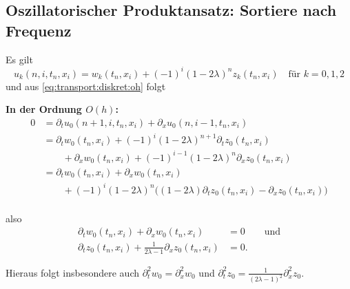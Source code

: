 \subsection{Oszillatorischer Produktansatz: Sortiere nach Frequenz}
\label{appendix:osz:sortiere_nach_frequenz}

Es gilt
\[ u_k(n, i, t_n, x_i) = w_k(t_n, x_i) + (-1)^i (1 - 2\lambda)^n z_k(t_n, x_i) \quad \text{für $k = 0,1,2$} \]
und aus \eqref{eq:transport:diskret:oh} folgt 

\vspace{0.4cm}
\noindent \textbf{In der Ordnung $O(h)$:}
\begin{align*}
0 &= \partial_t u_0(n+1, i, t_n, x_i) + \partial_x u_0(n, i-1, t_n, x_i)\\
&= \partial_t w_0(t_n, x_i) + (-1)^i (1 - 2\lambda)^{n+1} \partial_t z_0(t_n, x_i)\\
&\qquad + \partial_x w_0(t_n, x_i) + (-1)^{i-1} (1 - 2\lambda)^n \partial_x z_0(t_n, x_i)\\
&= \partial_t w_0(t_n, x_i) + \partial_x w_0(t_n, x_i)\\
&\qquad + (-1)^i (1 - 2\lambda)^n \bigl( (1 - 2\lambda) \partial_t z_0(t_n, x_i) - \partial_x z_0(t_n, x_i) \bigr) \\
\end{align*}

also
\begin{align*}
\partial_t w_0(t_n, x_i) + \partial_x w_0(t_n, x_i) &= 0 \qquad \text{und}\\
\partial_t z_0(t_n, x_i) + \frac {1}{2\lambda - 1} \partial_x z_0(t_n, x_i) &= 0.
\end{align*}

Hieraus folgt insbesondere auch $\partial^2_t w_0 = \partial^2_x w_0$ und $\partial^2_t z_0 = \frac {1}{(2\lambda - 1)^2} \partial^2_x z_0$.

